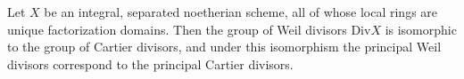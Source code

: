 Let $X$ be an integral, separated noetherian scheme, all of whose local rings are unique factorization domains. Then the group of Weil divisors $\text{Div} X$ is isomorphic to the group of Cartier divisors, and under this isomorphism the principal Weil divisors correspond to the principal Cartier divisors.
